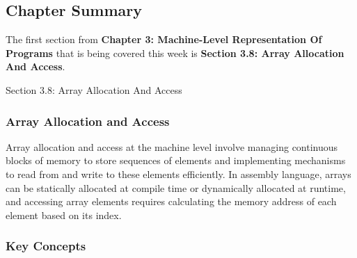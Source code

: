 \subsection{Chapter Summary}

The first section from \textbf{Chapter 3: Machine-Level Representation Of Programs} that is being covered this week is \textbf{Section 3.8: Array Allocation And Access}.

\begin{notes}{Section 3.8: Array Allocation And Access}
    \subsubsection*{Array Allocation and Access}

    Array allocation and access at the machine level involve managing continuous blocks of memory to store sequences of elements and implementing mechanisms to read from and write to these elements 
    efficiently. In assembly language, arrays can be statically allocated at compile time or dynamically allocated at runtime, and accessing array elements requires calculating the memory address of 
    each element based on its index. \vspace*{1em}
    
    \subsubsection*{Key Concepts}
    

\end{notes}
